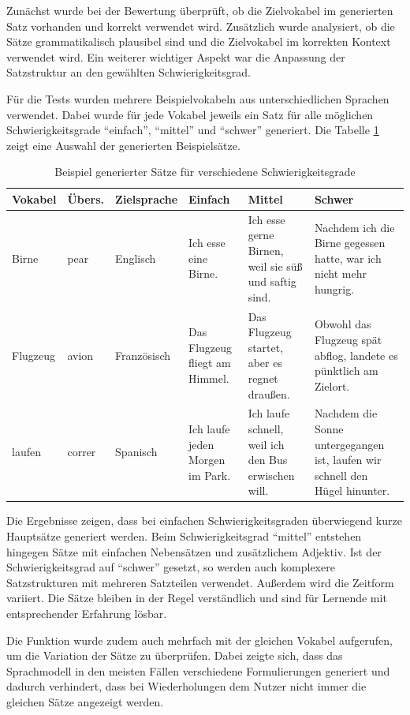 Zunächst wurde bei der Bewertung überprüft, ob die Zielvokabel im generierten Satz vorhanden und korrekt verwendet wird.
Zusätzlich wurde analysiert, ob die Sätze grammatikalisch plausibel sind und die Zielvokabel im korrekten Kontext verwendet wird.
Ein weiterer wichtiger Aspekt war die Anpassung der Satzstruktur an den gewählten Schwierigkeitsgrad.

Für die Tests wurden mehrere Beispielvokabeln aus unterschiedlichen Sprachen verwendet.
Dabei wurde für jede Vokabel jeweils ein Satz für alle möglichen Schwierigkeitsgrade \enquote{einfach}, \enquote{mittel} und \enquote{schwer} generiert.
Die Tabelle \ref{tabelle_satzgenerierung} zeigt eine Auswahl der generierten Beispielsätze.

\begin{table}[htbp]
\centering
\begin{tabularx}{\textwidth}{|l|l|l|X|X|X|}
\hline
\textbf{Vokabel} & \textbf{Übers.} & \textbf{Zielsprache} & \textbf{Einfach} & \textbf{Mittel} & \textbf{Schwer} \\
\hline
Birne & pear & Englisch & Ich esse eine Birne. & Ich esse gerne Birnen, weil sie süß und saftig sind. & Nachdem ich die Birne gegessen hatte, war ich nicht mehr hungrig. \\
\hline
Flugzeug & avion & Französisch & Das Flugzeug fliegt am Himmel. & Das Flugzeug startet, aber es regnet draußen. & Obwohl das Flugzeug spät abflog, landete es pünktlich am Zielort. \\
\hline
laufen & correr & Spanisch & Ich laufe jeden Morgen im Park. & Ich laufe schnell, weil ich den Bus erwischen will. & Nachdem die Sonne untergegangen ist, laufen wir schnell den Hügel hinunter. \\
\hline
\end{tabularx}
\caption{Beispiel generierter Sätze für verschiedene Schwierigkeitsgrade}
\label{tabelle_satzgenerierung}
\end{table}

Die Ergebnisse zeigen, dass bei einfachen Schwierigkeitsgraden überwiegend kurze Hauptsätze generiert werden.
Beim Schwierigkeitsgrad \enquote{mittel} entstehen hingegen Sätze mit einfachen Nebensätzen und zusätzlichem Adjektiv.
Ist der Schwierigkeitsgrad auf \enquote{schwer} gesetzt, so werden auch komplexere Satzstrukturen mit mehreren Satzteilen verwendet.
Außerdem wird die Zeitform variiert. Die Sätze bleiben in der Regel verständlich und sind für Lernende mit entsprechender Erfahrung lösbar.

Die Funktion wurde zudem auch mehrfach mit der gleichen Vokabel aufgerufen, um die Variation der Sätze zu überprüfen.
Dabei zeigte sich, dass das Sprachmodell in den meisten Fällen verschiedene Formulierungen generiert und dadurch verhindert, dass bei 
Wiederholungen dem Nutzer nicht immer die gleichen Sätze angezeigt werden.

